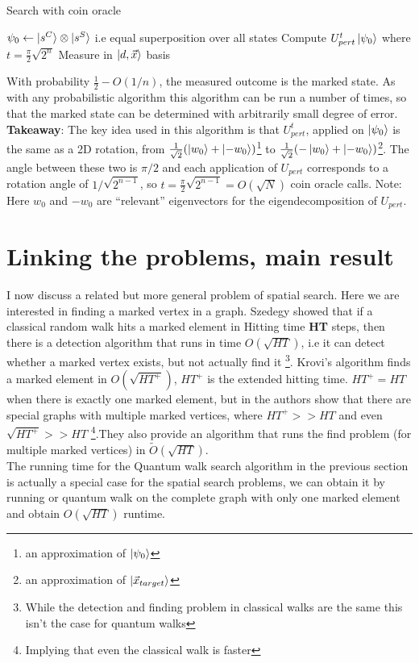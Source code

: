 \documentclass{article}
\begin{document}
\begin{algorithm}[H]
\caption{Search with coin oracle}\label{alg:q1}
\begin{algorithmic}[1]
\State $\psi_0 \gets \ket{s^C} \otimes \ket{s^S}$ i.e equal superposition over all states
\State Compute $U_{pert}^t \ket{\psi_0}$ where $t =\frac{\pi}{2}\sqrt{2^n}$
\State Measure in $\ket{d,\vec{x}}$ basis
\EndProcedure
\end{algorithmic}
\end{algorithm}
With probability $\frac{1}{2} - O(1/n)$, the measured outcome is the marked state. As with any probabilistic algorithm this algorithm can be run a number of times, so that the marked state can be determined with arbitrarily small degree of error.\\

\textbf{Takeaway}: The key idea used in this algorithm is that $U_{pert}^t$, applied on $\ket{\psi_0}$ is the same as a 2D rotation, from $\frac{1}{\sqrt{2}}(\ket{w_0} + \ket{-w_0})$\footnote{an approximation of $\ket{\psi_0}$} to $\frac{1}{\sqrt{2}}(-\ket{w_0} + \ket{-w_0})$\footnote{an approximation of $\ket{\vec{x}_{target}}$}. The angle between these two is $\pi/2$ and each application of $U_{pert}$ corresponds to a rotation angle of $1/\sqrt{2^{n-1}}$, so $t = \frac{\pi}{2} \sqrt{2^{n-1}} = O(\sqrt{N})$ coin oracle calls. Note: Here $w_0$ and $-w_0$ are ``relevant'' eigenvectors for the eigendecomposition of $U_{pert}$.

\section{Linking the problems, main result}
I now discuss a related but more general problem of spatial search. Here we are interested in finding a marked vertex in a graph. Szedegy \cite{Szegedy2004QuantumSO} showed that if a classical random walk hits a marked element in Hitting time \textbf{HT} steps, then there is a detection algorithm that runs in time $O(\sqrt{HT})$, i.e it can detect whether a marked vertex exists, but not actually find it \footnote{While the detection and finding problem in classical walks are the same this isn't the case for quantum walks}. Krovi's\cite{Krovi2015QuantumWC} algorithm finds a marked element in $O(\sqrt{HT^+})$,  $HT^{+}$ is the extended hitting time. $HT^+ = HT$ when there is exactly one marked element, but in \cite{Ambainis2019QuadraticSF} the authors show that there are special graphs with multiple marked vertices, where $HT^+ >> HT$ and even $\sqrt{HT^+} >> HT$ \footnote{Implying that even the classical walk is faster}.They also provide an algorithm that runs the find problem (for multiple marked vertices) in $\tilde{O}(\sqrt{HT})$.\\
The running time for the Quantum walk search algorithm in the previous section is actually a special case for the spatial search problems, we can obtain it by running \cite{Krovi2015QuantumWC} or \cite{Ambainis2019QuadraticSF} quantum walk on the complete graph with only one marked element and obtain $O(\sqrt{HT})$ runtime. 
\end{document}
